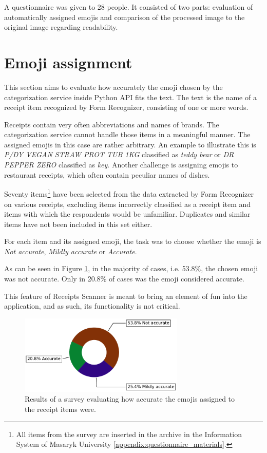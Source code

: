\documentclass[
  printed, %
  table,   %
  oneside, %
  lof,     %
  lot,     %
]{fithesis3}
\begin{document}
A questionnaire was given to 28 people. It consisted of two parts: evaluation of automatically assigned emojis and comparison of the processed image to the original image regarding readability.

\section{Emoji assignment}
This section aims to evaluate how accurately the emoji chosen by the categorization service inside Python API fits the text. The text is the name of a receipt item recognized by Form Recognizer, consisting of one or more words.

Receipts contain very often abbreviations and names of brands. The categorization service cannot handle those items in a meaningful manner. The assigned emojis in this case are rather arbitrary. An example to illustrate this is \textit{P/DY VEGAN STRAW PROT TUB 1KG} classified as \textit{ teddy bear} or \textit{DR PEPPER ZERO} classified as \textit{ key}. Another challenge is assigning emojis to restaurant receipts, which often contain peculiar names of dishes.

Seventy items\footnote{All items from the survey are inserted in the archive in the Information System of Masaryk University \ref{appendix:questionnaire_materials}.} have been selected from the data extracted by Form Recognizer on various receipts, excluding items incorrectly classified as a receipt item and items with which the respondents would be unfamiliar. Duplicates and similar items have not been included in this set either.

For each item and its assigned emoji, the task was to choose whether the emoji is \textit{Not accurate}, \textit{Mildly accurate} or \textit{Accurate}.

As can be seen in Figure \ref{fig:quality_of_emojis}, in the majority of cases, i.e. 53.8\%, the chosen emoji was not accurate. Only in 20.8\% of cases was the emoji considered accurate.

This feature of Receipts Scanner is meant to bring an element of fun into the application, and as such, its functionality is not critical. 

\begin{figure}
    \begin{center}
        \includegraphics[width=0.7\textwidth]{figures/graphs/quality_of_emojis}
    \end{center}
    \caption{Results of a survey evaluating how accurate the emojis assigned to the receipt items were.}
    \label{fig:quality_of_emojis}
\end{figure}
\end{document}
